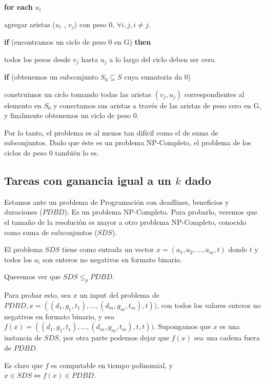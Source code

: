 \documentclass[a4paper,10pt]{article}
\begin{document}
\textbf{\textcolor[rgb]{0.0,0.5019608,0.0}{for each}} \( u_{i} \)

\quad agregar aristas (\( u_{i} \) , \( v_{j} \)) con peso 0, \( \forall i,j, i \neq j\). 

\textbf{\textcolor[rgb]{0.0,0.5019608,0.0}{if}} (encontramos un ciclo de peso 0 en G) \textbf{\textcolor[rgb]{0.0,0.5019608,0.0}{then}}

\quad todos los pesos desde \( v_{j} \) hasta \( u_{j} \) a lo largo del ciclo deben ser cero.
		
\textbf{\textcolor[rgb]{0.0,0.5019608,0.0}{if}} (obtenemos un subconjunto \( S_{0} \subseteq S \) cuya sumatoria da 0)

\quad construimos un ciclo tomando todas las aristas \( (v_{j}, u_{j}) \) correspondientes al elemento en \( S_{0}\) y conectamos sus aristas a través de las aristas de peso cero en G, y finalmente obtenemos un ciclo de peso 0.

\bigskip

Por lo tanto, el problema es al menos tan difícil como el de suma de subconjuntos. Dado que éste es un problema NP-Completo, el problema de los ciclos de peso 0 también lo es.

\subsection{Tareas con ganancia igual a un \(k\) dado}

Estamos ante un problema de Programación con deadlines, beneficios y duraciones (\(PDBD\)). Es un problema NP-Completo. Para probarlo, veremos que el tamaño de la resolución es mayor a otro problema NP-Completo, conocido como suma de subconjuntos (\(SDS\)).

El problema \(SDS\) tiene como entrada un vector \(x = (a_{1}, a_{2},..., a_{m}, t)\) donde \(t\) y todos los \(a_{i}\) son enteros no negativos en formato binario.

Queremos ver que \(SDS \le_{p} PDBD\).

Para probar esto, sea \(x\) un input del problema de \( PDBD, x = (( d_{1}, g_{1}, t_{1}),...,(d_{m}, g_{m}, t_{m}), t)) \), con todos los valores enteros no negativos en formato binario, y sea \(f(x) =  (( d_{1}, g_{1}, t_{1}),...,(d_{m}, g_{m}, t_{m}), t, t)) \). Supongamos que \(x\) es una instancia de \(SDS\), por otra parte podemos dejar que \(f(x)\) sea una cadena fuera de \(PDBD\).

Es claro que \(f\) es computable en tiempo polinomial, y \( x \in SDS \Leftrightarrow f(x) \in PDBD\).
\end{document}

